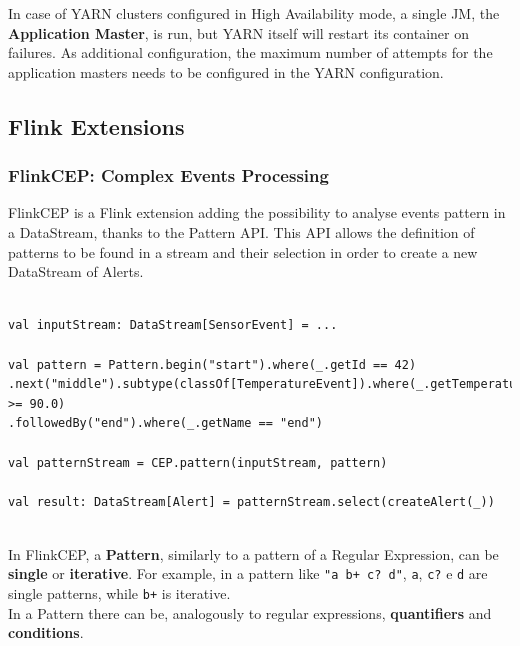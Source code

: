 In case of YARN clusters configured in High Availability mode, a single JM, the \textbf{Application Master}, is run, but YARN itself will restart its container on failures. As additional configuration, the maximum number of attempts for the application masters needs to be configured in the YARN configuration.

\subsection{Flink Extensions} \label{FlinkLibs}

\subsubsection{FlinkCEP: Complex Events Processing}

FlinkCEP is a Flink extension adding the possibility to analyse events pattern in a DataStream, thanks to the Pattern API. This API allows the definition of patterns to be found in a stream and their selection in order to create a new DataStream of Alerts.\\


\begin{code}
\label{code:pattern-example}
\begin{verbatim}

val inputStream: DataStream[SensorEvent] = ...

val pattern = Pattern.begin("start").where(_.getId == 42)
.next("middle").subtype(classOf[TemperatureEvent]).where(_.getTemperature >= 90.0)
.followedBy("end").where(_.getName == "end")

val patternStream = CEP.pattern(inputStream, pattern)

val result: DataStream[Alert] = patternStream.select(createAlert(_))
\end{verbatim}
\end{code}~\\

In FlinkCEP, a \textbf{Pattern}, similarly to a pattern of a Regular Expression, can be \textbf{single} or \textbf{iterative}. For example, in a pattern like \texttt{"a b+ c? d"}, \texttt{a}, \texttt{c?} e \texttt{d} are single patterns, while \texttt{b+} is iterative.
\\

In a Pattern there can be, analogously to regular expressions, \textbf{quantifiers} and \textbf{conditions}.

